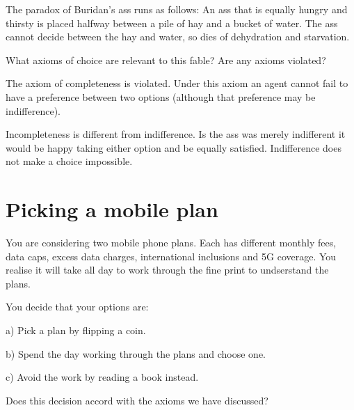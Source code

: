 \documentclass[
  letterpaper,
  DIV=11,
  numbers=noendperiod]{scrreprt}
\begin{document}
The paradox of Buridan's ass runs as follows: An ass that is equally
hungry and thirsty is placed halfway between a pile of hay and a bucket
of water. The ass cannot decide between the hay and water, so dies of
dehydration and starvation.

What axioms of choice are relevant to this fable? Are any axioms
violated?

\begin{tcolorbox}[enhanced jigsaw, title=\textcolor{quarto-callout-tip-color}{\faLightbulb}\hspace{0.5em}{Answer}, toprule=.15mm, colback=white, breakable, titlerule=0mm, colframe=quarto-callout-tip-color-frame, coltitle=black, opacityback=0, rightrule=.15mm, colbacktitle=quarto-callout-tip-color!10!white, bottomtitle=1mm, opacitybacktitle=0.6, arc=.35mm, bottomrule=.15mm, toptitle=1mm, leftrule=.75mm, left=2mm]

The axiom of completeness is violated. Under this axiom an agent cannot
fail to have a preference between two options (although that preference
may be indifference).

Incompleteness is different from indifference. Is the ass was merely
indifferent it would be happy taking either option and be equally
satisfied. Indifference does not make a choice impossible.

\end{tcolorbox}

\hypertarget{picking-a-mobile-plan}{%
\section{Picking a mobile plan}\label{picking-a-mobile-plan}}

You are considering two mobile phone plans. Each has different monthly
fees, data caps, excess data charges, international inclusions and 5G
coverage. You realise it will take all day to work through the fine
print to undserstand the plans.

You decide that your options are:

a) Pick a plan by flipping a coin.

b) Spend the day working through the plans and choose one.

c) Avoid the work by reading a book instead.

Does this decision accord with the axioms we have discussed?
\end{document}
